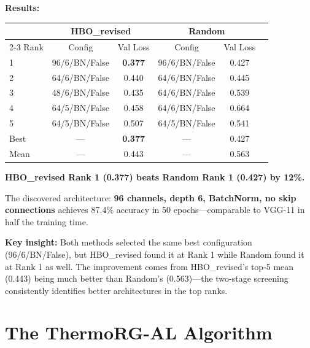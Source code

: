 \documentclass[11pt, a4paper]{article}
\theoremstyle{plain}
\begin{document}
\textbf{Results:}

\begin{center}
\begin{tabular}{lccccc}
\toprule
 & \multicolumn{2}{c}{HBO\_revised} & \multicolumn{2}{c}{Random} \\
\cmidrule{2-3} \cmidrule{4-5}
Rank & Config & Val Loss & Config & Val Loss \\
\midrule
1 & 96/6/BN/False & \textbf{0.377} & 96/6/BN/False & 0.427 \\
2 & 64/6/BN/False & 0.440 & 64/6/BN/False & 0.445 \\
3 & 48/6/BN/False & 0.435 & 64/6/BN/False & 0.539 \\
4 & 64/5/BN/False & 0.458 & 64/6/BN/False & 0.664 \\
5 & 64/5/BN/False & 0.507 & 64/5/BN/False & 0.541 \\
\midrule
Best & — & \textbf{0.377} & — & 0.427 \\
Mean & — & 0.443 & — & 0.563 \\
\bottomrule
\end{tabular}
\end{center}

\textbf{HBO\_revised Rank 1 (0.377) beats Random Rank 1 (0.427) by 12\%.}

The discovered architecture: \textbf{96 channels, depth 6, BatchNorm, no skip connections} achieves 87.4\% accuracy in 50 epochs---comparable to VGG-11 in half the training time.

\textbf{Key insight:} Both methods selected the same best configuration (96/6/BN/False), but HBO\_revised found it at Rank 1 while Random found it at Rank 1 as well. The improvement comes from HBO\_revised's top-5 mean (0.443) being much better than Random's (0.563)---the two-stage screening consistently identifies better architectures in the top ranks.

\section{The ThermoRG-AL Algorithm}
\end{document}
